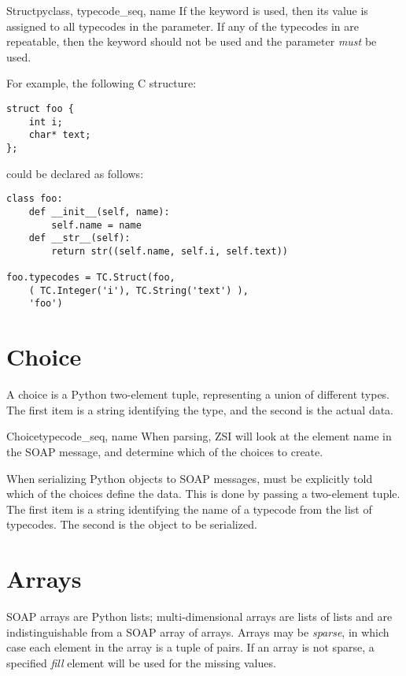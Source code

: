 \begin{classdesc}{Struct}{pyclass, typecode_seq, name}
If the  keyword is used, then its value is assigned to
all typecodes in the  parameter.
If any of the typecodes in  are repeatable, then the
 keyword should not be used and the  parameter
\emph{must} be used.

For example, the following C structure:
\begin{verbatim}
struct foo {
    int i;
    char* text;
};
\end{verbatim}
could be declared as follows:
\begin{verbatim}
class foo:
    def __init__(self, name):
        self.name = name
    def __str__(self):
        return str((self.name, self.i, self.text))

foo.typecodes = TC.Struct(foo,
    ( TC.Integer('i'), TC.String('text') ),
    'foo')
\end{verbatim}
\end{classdesc}

\section{Choice}

A choice is a Python two-element  tuple, representing
a union of different types.
The first item is a string identifying the type, and the second is the
actual data.

\begin{classdesc}{Choice}{typecode_seq, name}
When parsing, ZSI will look at the element name in the SOAP message, and
determine which of the choices to create.

When serializing Python objects to SOAP messages, \ZSI{} must be
explicitly told which of the choices define the data.
This is done by passing a two-element tuple.
The first item is a string identifying the name of a typecode
from the  list of typecodes.
The second is the object to be serialized.
\end{classdesc}

\section{Arrays}

SOAP arrays are Python lists; multi-dimensional arrays are
lists of lists and are indistinguishable from a SOAP array of arrays.
Arrays may be \emph{sparse}, in which case each element in the
array is a tuple of  pairs.
If an array is not sparse, a specified \emph{fill} element will be
used for the missing values.

